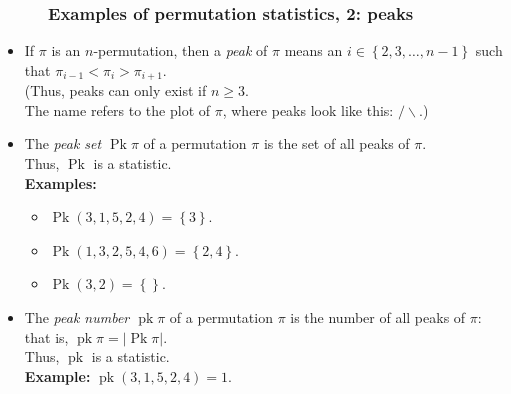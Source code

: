 \documentclass{beamer}
\newcommand{\Pk}{\operatorname{Pk}}
\newcommand{\pk}{\operatorname{pk}}
\newcommand{\fti}[1]{\frametitle{\ \ \ \ \ #1}}
\newcommand{\set}[1]{\left\{ #1 \right\}}
\newcommand{\abs}[1]{\left| #1 \right|}
\newcommand{\tup}[1]{\left( #1 \right)}
\newcommand{\defn}[1]{{\color{darkred}\emph{#1}}} %
\theoremstyle{plain}
\begin{document}
\begin{frame}
\fti{Examples of permutation statistics, 2: peaks}

\begin{itemize}

\item If $\pi$ is an $n$-permutation, then a \defn{peak} of $\pi$
      means an $i \in \set{2, 3, \ldots, n-1}$ such that
      $\pi_{i-1} < \pi_i > \pi_{i+1}$. \\
      (Thus, peaks can only exist if $n \geq 3$. \\
      The name refers to the plot of $\pi$, where peaks look
      like this: $/\backslash$.)

\pause

\item The \defn{peak set $\Pk \pi$} of a permutation $\pi$ is
      the set of all peaks of $\pi$. \\
      Thus, \defn{$\Pk$} is a statistic. \\
      \textbf{Examples:}
      \begin{itemize}
      \item $\Pk \tup{3, 1, 5, 2, 4} = \set{3}$.
      \item $\Pk \tup{1, 3, 2, 5, 4, 6} = \set{2, 4}$.
      \item $\Pk \tup{3, 2} = \set{}$.
      \end{itemize}

\pause

\item The \defn{peak number $\pk \pi$} of a permutation $\pi$
      is the number of all peaks of $\pi$: that is,
      $\pk \pi = \abs{\Pk \pi}$. \\
      Thus, \defn{$\pk$} is a statistic. \\
      \textbf{Example:} $\pk \tup{3, 1, 5, 2, 4} = 1$.

\end{itemize}
\vspace{10cm}
\end{frame}
\end{document}
